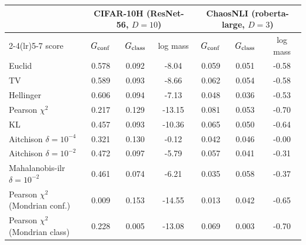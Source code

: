 \begin{tabular}{lcccccc}\toprule
 & \multicolumn{3}{c}{CIFAR-10H (ResNet-56, $D{=}10$)} & \multicolumn{3}{c}{ChaosNLI (roberta-large, $D{=}3$)}\\
\cmidrule(lr){2-4}\cmidrule(lr){5-7}
score & $G_{\rm conf}$ & $G_{\rm class}$ & log mass & $G_{\rm conf}$ & $G_{\rm class}$ & log mass\\\midrule
Euclid & 0.578 & 0.092 & -8.04 & 0.059 & 0.051 & -0.58\\
TV & 0.589 & 0.093 & -8.66 & 0.062 & 0.054 & -0.58\\
Hellinger & 0.606 & 0.094 & -7.13 & 0.048 & 0.036 & -0.53\\
Pearson $\chi^2$ & 0.217 & 0.129 & -13.15 & 0.081 & 0.053 & -0.70\\
KL & 0.457 & 0.093 & -10.36 & 0.065 & 0.050 & -0.64\\
Aitchison $\delta{=}10^{-4}$ & 0.321 & 0.130 & -0.12 & 0.042 & 0.046 & -0.00\\
Aitchison $\delta{=}10^{-2}$ & 0.472 & 0.097 & -5.79 & 0.057 & 0.041 & -0.31\\
Mahalanobis-ilr $\delta{=}10^{-2}$ & 0.461 & 0.074 & -6.21 & 0.035 & 0.058 & -0.37\\
Pearson $\chi^2$ (Mondrian conf.) & 0.009 & 0.153 & -14.55 & 0.013 & 0.042 & -0.65\\
Pearson $\chi^2$ (Mondrian class) & 0.228 & 0.005 & -13.08 & 0.069 & 0.003 & -0.70\\
\bottomrule\end{tabular}
